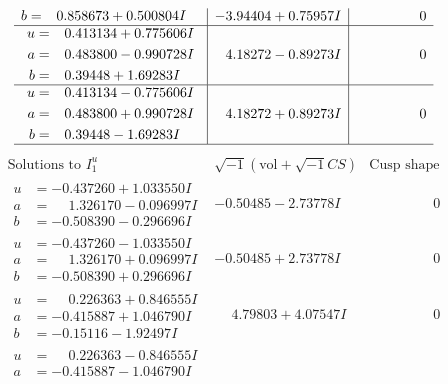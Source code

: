 \documentclass[1p]{elsarticle_modified}
\theoremstyle{definition}
\newcommand{\I}{\sqrt{-1}}
\begin{document}
$$\begin{array}{c|c|c}
\begin{aligned}
b &= \phantom{-}0.858673 + 0.500804 I\end{aligned}
 & -3.94404 + 0.75957 I & \phantom{-0.000000 } 0 \\ \hline\begin{aligned}
u &= \phantom{-}0.413134 + 0.775606 I \\
a &= \phantom{-}0.483800 - 0.990728 I \\
b &= \phantom{-}0.39448 + 1.69283 I\end{aligned}
 & \phantom{-}4.18272 - 0.89273 I & \phantom{-0.000000 } 0 \\ \hline\begin{aligned}
u &= \phantom{-}0.413134 - 0.775606 I \\
a &= \phantom{-}0.483800 + 0.990728 I \\
b &= \phantom{-}0.39448 - 1.69283 I\end{aligned}
 & \phantom{-}4.18272 + 0.89273 I & \phantom{-0.000000 } 0\\
 \hline 
 \end{array}$$\newpage$$\begin{array}{c|c|c}  
\text{Solutions to }I^u_{1}& \I (\text{vol} + \sqrt{-1}CS) & \text{Cusp shape}\\
 \hline 
\begin{aligned}
u &= -0.437260 + 1.033550 I \\
a &= \phantom{-}1.326170 - 0.096997 I \\
b &= -0.508390 - 0.296696 I\end{aligned}
 & -0.50485 - 2.73778 I & \phantom{-0.000000 } 0 \\ \hline\begin{aligned}
u &= -0.437260 - 1.033550 I \\
a &= \phantom{-}1.326170 + 0.096997 I \\
b &= -0.508390 + 0.296696 I\end{aligned}
 & -0.50485 + 2.73778 I & \phantom{-0.000000 } 0 \\ \hline\begin{aligned}
u &= \phantom{-}0.226363 + 0.846555 I \\
a &= -0.415887 + 1.046790 I \\
b &= -0.15116 - 1.92497 I\end{aligned}
 & \phantom{-}4.79803 + 4.07547 I & \phantom{-0.000000 } 0 \\ \hline\begin{aligned}
u &= \phantom{-}0.226363 - 0.846555 I \\
a &= -0.415887 - 1.046790 I \\

\end{aligned}
\end{array}$$
\end{document}
